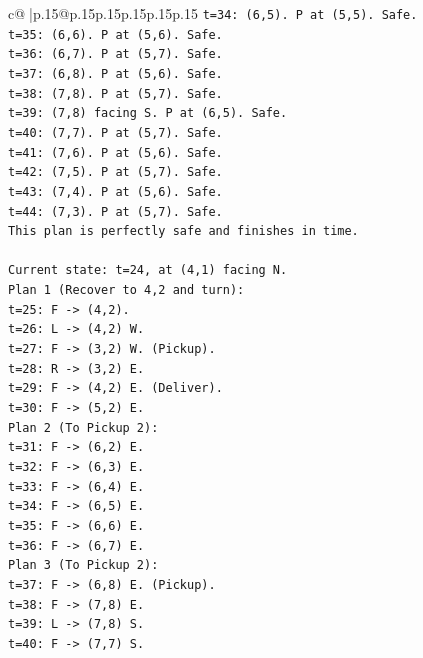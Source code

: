 \documentclass{article}
\begin{document}
{\begin{supertabular}{c@{$\;$}|p{.15\linewidth}@{}p{.15\linewidth}p{.15\linewidth}p{.15\linewidth}p{.15\linewidth}p{.15\linewidth}}
{{{\texttt{t=34: (6,5). P at (5,5). Safe.} \\
\texttt{t=35: (6,6). P at (5,6). Safe.} \\
\texttt{t=36: (6,7). P at (5,7). Safe.} \\
\texttt{t=37: (6,8). P at (5,6). Safe.} \\
\texttt{t=38: (7,8). P at (5,7). Safe.} \\
\texttt{t=39: (7,8) facing S. P at (6,5). Safe.} \\
\texttt{t=40: (7,7). P at (5,7). Safe.} \\
\texttt{t=41: (7,6). P at (5,6). Safe.} \\
\texttt{t=42: (7,5). P at (5,7). Safe.} \\
\texttt{t=43: (7,4). P at (5,6). Safe.} \\
\texttt{t=44: (7,3). P at (5,7). Safe.} \\
\texttt{This plan is perfectly safe and finishes in time.} \\
\\ 
\texttt{Current state: t=24, at (4,1) facing N.} \\
\texttt{Plan 1 (Recover to 4,2 and turn):} \\
\texttt{t=25: F {-}> (4,2).} \\
\texttt{t=26: L {-}> (4,2) W.} \\
\texttt{t=27: F {-}> (3,2) W. (Pickup).} \\
\texttt{t=28: R {-}> (3,2) E.} \\
\texttt{t=29: F {-}> (4,2) E. (Deliver).} \\
\texttt{t=30: F {-}> (5,2) E.} \\
\texttt{Plan 2 (To Pickup 2):} \\
\texttt{t=31: F {-}> (6,2) E.} \\
\texttt{t=32: F {-}> (6,3) E.} \\
\texttt{t=33: F {-}> (6,4) E.} \\
\texttt{t=34: F {-}> (6,5) E.} \\
\texttt{t=35: F {-}> (6,6) E.} \\
\texttt{t=36: F {-}> (6,7) E.} \\
\texttt{Plan 3 (To Pickup 2):} \\
\texttt{t=37: F {-}> (6,8) E. (Pickup).} \\
\texttt{t=38: F {-}> (7,8) E.} \\
\texttt{t=39: L {-}> (7,8) S.} \\
\texttt{t=40: F {-}> (7,7) S.} \\
}}}
\end{supertabular}}
\end{document}
